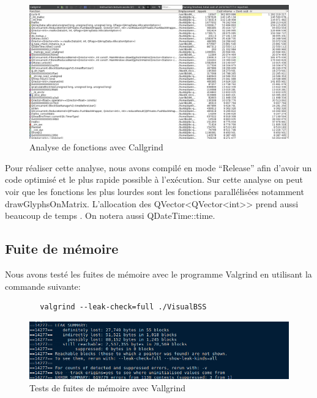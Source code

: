 \documentclass[12pt]{article}
\begin{document}
		\begin{figure}[!h]
		\begin{center}
		\includegraphics[scale=.38]{callgrind_analyse.png}
		\caption{Analyse de fonctions avec Callgrind}
		\end{center}
		\end{figure}
	
		Pour réaliser cette analyse, nous avons compilé en mode “Release” afin d’avoir
		un code optimisé et le plus rapide possible à l’exécution.
		Sur cette analyse on peut voir que les fonctions les plus lourdes sont les fonctions
		parallélisées notamment drawGlyphsOnMatrix. L’allocation des QVector<QVector<int>>
		prend aussi beaucoup de temps . On notera aussi QDateTime::time.
		
		\subsection{Fuite de mémoire}
		Nous avons testé les fuites de mémoire avec le programme Valgrind en utilisant la
		commande suivante:
	
		\begin{verbatim}	
		valgrind --leak-check=full ./VisualBSS
		\end{verbatim}
	
		\begin{figure}[!h]
		\begin{center}
		\includegraphics[scale=.5]{memory_leak.png}
		\caption{Tests de fuites de mémoire avec Vallgrind}
		\end{center}
		\end{figure}	
	
\end{document}
